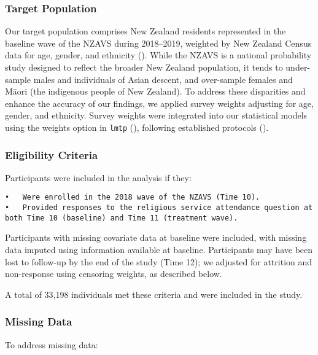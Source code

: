\documentclass[
  single column]{article}
\begin{document}
\subsubsection{Target Population}\label{target-population}

Our target population comprises New Zealand residents represented in the
baseline wave of the NZAVS during 2018--2019, weighted by New Zealand
Census data for age, gender, and ethnicity
(). While the NZAVS is a national
probability study designed to reflect the broader New Zealand
population, it tends to under-sample males and individuals of Asian
descent, and over-sample females and Māori (the indigenous people of New
Zealand). To address these disparities and enhance the accuracy of our
findings, we applied survey weights adjusting for age, gender, and
ethnicity. Survey weights were integrated into our statistical models
using the weights option in \texttt{lmtp}
(), following
established protocols ().

\subsubsection{Eligibility Criteria}\label{eligibility-criteria}

Participants were included in the analysis if they:

\begin{verbatim}
•   Were enrolled in the 2018 wave of the NZAVS (Time 10).
•   Provided responses to the religious service attendance question at both Time 10 (baseline) and Time 11 (treatment wave).
\end{verbatim}

Participants with missing covariate data at baseline were included, with
missing data imputed using information available at baseline.
Participants may have been lost to follow-up by the end of the study
(Time 12); we adjusted for attrition and non-response using censoring
weights, as described below.

A total of 33,198 individuals met these criteria and were included in
the study.

\subsubsection{Missing Data}\label{missing-data}

To address missing data:
\end{document}
